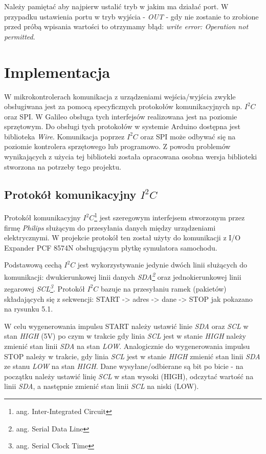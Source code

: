 \documentclass{xmgr}
\begin{document}
Należy pamiętać aby najpierw ustalić tryb w jakim ma działać port. W przypadku ustawienia portu w tryb wyjścia - \emph{OUT} - gdy nie zostanie to zrobione przed próbą wpisania wartości to otrzymamy błąd: \emph{write error: Operation not permitted}.


\chapter{Implementacja}
W mikrokontrolerach komunikacja z urządzeniami wejścia/wyjścia zwykle obsługiwana jest za pomocą specyficznych protokołów komunikacyjnych np. $I^2C$ oraz SPI. W Galileo obsługa tych interfejsów realizowana jest na poziomie sprzętowym. Do obsługi tych protokołów w systemie Arduino dostępna jest biblioteka \emph{Wire}. Komunikacja poprzez $I^2C$  oraz SPI może odbywać się na poziomie kontrolera sprzętowego lub programowo. Z powodu problemów wynikających z użycia tej biblioteki została opracowana osobna wersja biblioteki stworzona na potrzeby tego projektu.

\section{Protokół komunikacyjny $I^2C$}
Protokół komunikacyjny \emph{$I^2C$}\footnote{ang. Inter-Integrated Circuit} jest szeregowym interfejsem stworzonym przez firmę \emph{Philips} służącym do przesyłania danych między urządzeniami elektrycznymi. W projekcie protokół ten został użyty do komunikacji z I/O Expander PCF 8574N obsługującym płytkę symulatora samochodu.

Podstawową cechą \emph{$I^2C$} jest wykorzystywanie jedynie dwóch linii służących do komunikacji: dwukierunkowej linii danych \emph{SDA\footnote{ang. Serial Data Line}} oraz jednokierunkowej linii zegarowej \emph{SCL\footnote{ang. Serial Clock Time}}. Protokół $I^2C$ bazuje na przesyłaniu ramek (pakietów) składających się z sekwencji: START -> adres -> dane -> STOP jak pokazano na rysunku 5.1.

W celu wygenerowania impulsu START należy ustawić linie \emph{SDA} oraz \emph{SCL} w stan \emph{HIGH} (5V) po czym w trakcie gdy linia \emph{SCL} jest w stanie \emph{HIGH} należy zmienić stan linii \emph{SDA} na stan \emph{LOW}. Analogicznie do wygenerowania impulsu STOP należy w trakcie, gdy linia \emph{SCL} jest w stanie \emph{HIGH} zmienić stan linii \emph{SDA} ze stanu \emph{LOW} na stan \emph{HIGH}. Dane wysyłane/odbierane są bit po bicie - na początku należy ustawić linię \emph{SCL} w stan wysoki (HIGH), odczytać wartość na linii \emph{SDA}, a następnie zmienić stan linii \emph{SCL} na niski (LOW).
\end{document}
